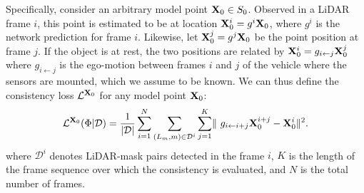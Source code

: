 



Specifically, consider an arbitrary model point $\mathbf{X}_0\in S_0$.
Observed in a LiDAR frame $i$, this point is estimated to be at location $\mathbf{X}_0^i = g^i \mathbf{X}_0$, where $g^i$ is the network prediction for frame $i$.
Likewise, let $\mathbf{X}_0^j = g^j \mathbf{X}_0$ be the point position at frame $j$.
If the object is at rest, the two positions are related by
$
    \mathbf{X}^i_0 = g_{i \leftarrow j} \mathbf{X}^j_0
$
where $g_{i \leftarrow j}$ is the ego-motion between frames $i$ and $j$ of the vehicle where the sensors are mounted, which we assume to be known.
We can thus define the consistency loss $\mathcal{L}^{\mathbf{X}_0}$ for any model point $\mathbf{X}_0$:
%
\begin{equation}\label{e:keypointloss}
   \mathcal{L}^{\mathbf{X}_0}(\Phi|\mathcal{D})
=
  \frac{1}{|\mathcal{D}|}
  \sum^N_{i=1}
  \sum_{(L_m,m)\in\mathcal{D}^i}
  \sum^K_{j=1} \lVert\ g_{i \leftarrow i + j}
  \mathbf{X}_0^{i+j} - \mathbf{X}_0^i
  \rVert^2.
\end{equation}
where $\mathcal{D}^i$ denotes LiDAR-mask pairs detected in the frame $i$, $K$ is the length of the frame sequence over which the consistency is evaluated, and $N$ is the total number of frames.

